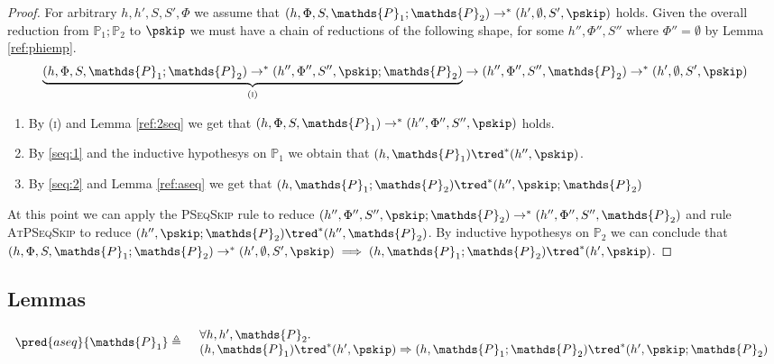 {\begin{proof}
For arbitrary $h, h', S, S', \Phi$ we assume that $(h, \Phi, S, \mathds{P}_1 ; \mathds{P}_2) \rightarrow^* (h', \emptyset, S', \pskip)$ holds. Given the overall reduction from $\mathds{P}_1 ; \mathds{P}_2$ to $\pskip$ we must have a chain of reductions of the following shape, for some $h'', \Phi'', S''$ where $\Phi'' = \emptyset$ by Lemma \ref{ref:phiemp}.
\[
\underbrace{(h, \Phi, S, \mathds{P}_1 ; \mathds{P}_2) \rightarrow^* (h'', \Phi'', S'', \pskip; \mathds{P}_2)}_{(\textsc{i})}
\rightarrow (h'', \Phi'', S'', \mathds{P}_2) \rightarrow^* (h', \emptyset, S', \pskip)
\]
\begin{enumerate}
\item \label{seq:1} By (\textsc{i}) and Lemma \ref{ref:2seq} we get that $(h, \Phi, S, \mathds{P}_1) \rightarrow^* (h'', \Phi'', S'', \pskip)$ holds.
\item \label{seq:2} By \ref{seq:1} and the inductive hypothesys on $\mathds{P}_1$ we obtain that $(h, \mathds{P}_1) \tred^* (h'', \pskip)$.
\item By \ref{seq:2} and Lemma \ref{ref:aseq} we get that $(h, \mathds{P}_1 ; \mathds{P}_2) \tred^* (h'', \pskip ; \mathds{P}_2)$
\end{enumerate}

At this point we can apply the \textsc{PSeqSkip} rule to reduce $(h'', \Phi'', S'', \pskip ; \mathds{P}_2) \rightarrow^* (h'', \Phi'', S'', \mathds{P}_2)$ and rule \textsc{AtPSeqSkip} to reduce $(h'', \pskip ; \mathds{P}_2) \tred^* (h'', \mathds{P}_2)$. By inductive hypothesys on $\mathds{P}_2$ we can conclude that $(h, \Phi, S, \mathds{P}_1 ; \mathds{P}_2) \rightarrow^* (h', \emptyset, S', \pskip) \implies (h, \mathds{P}_1 ; \mathds{P}_2) \tred^* (h', \pskip)$.
\end{proof}
}

\subsection{Lemmas}

\lem \label{ref:aseq}
\[
\begin{array}{r l}
	\pred{aseq}{\mathds{P}_1} \triangleq
	&
	\begin{array}{l}
	\forall h, h', \mathds{P}_2 \ldotp \\
	(h, \mathds{P}_1) \tred^* (h', \pskip) \Rightarrow 
	(h, \mathds{P}_1; \mathds{P}_2) \tred^* (h', \pskip; \mathds{P}_2)
	\end{array}
\end{array}
\]

